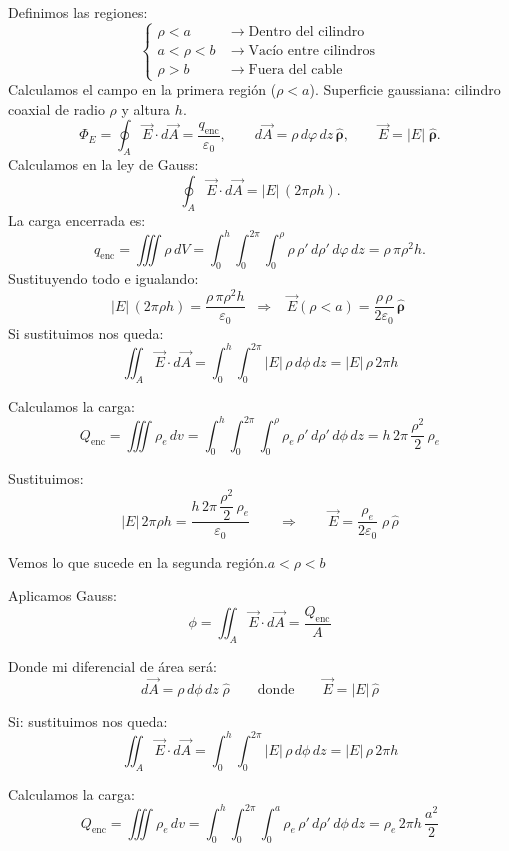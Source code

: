 \documentclass[a4paper,12pt]{article}
\begin{document}
\medskip
\noindent
Definimos las regiones:
\[
\left\{
\begin{aligned}
\rho < a      &\;\rightarrow\; \text{Dentro del cilindro} \\
a < \rho < b  &\;\rightarrow\; \text{Vacío entre cilindros} \\
\rho > b      &\;\rightarrow\; \text{Fuera del cable}
\end{aligned}
\right.
\]
Calculamos el campo en la primera región (\(\rho<a\)).  
Superficie gaussiana: cilindro coaxial de radio \(\rho\) y altura \(h\).
\[
\Phi_E=\oint_{A}\vec E\cdot d\vec A=\frac{q_{\text{enc}}}{\varepsilon_0},\qquad
d\vec A=\rho\,d\varphi\,dz\,\hat{\boldsymbol \rho},\qquad
\vec E=|\!E|\;\hat{\boldsymbol \rho}.
\]
Calculamos en la ley de Gauss:
\[
\oint_{A}\vec E\cdot d\vec A = |\!E|\,(2\pi \rho h).
\]
La carga encerrada es:
\[
q_{\text{enc}}=\iiint \rho\, dV
=\int_{0}^{h}\!\!\int_{0}^{2\pi}\!\!\int_{0}^{\rho}\rho\,\rho'\,d\rho'\,d\varphi\,dz
=\rho\,\pi \rho^{2} h.
\]
Sustituyendo todo e igualando:
\[
|\!E|\,(2\pi \rho h)=\frac{\rho\,\pi \rho^{2} h}{\varepsilon_0}
\;\;\Longrightarrow\;\;
\boxed{\;\vec E(\rho<a)=\dfrac{\rho\,\rho}{2\varepsilon_0}\,\hat{\boldsymbol \rho}\;}
\]
\newpage
\noindent
Si sustituimos nos queda:
\[
\iint_{A} \vec{E}\cdot d\vec{A}
=\int_{0}^{h}\!\!\int_{0}^{2\pi} |E|\,\rho\, d\phi\, dz
=|E|\,\rho\,2\pi h
\]

\noindent
Calculamos la carga:
\[
Q_{\text{enc}}
=\iiint \rho_{e}\,dv
=\int_{0}^{h}\!\!\int_{0}^{2\pi}\!\!\int_{0}^{\rho}
\rho_{e}\,\rho'\, d\rho'\, d\phi\, dz
=h\,2\pi\,\frac{\rho^{2}}{2}\,\rho_{e}
\]

\noindent
Sustituimos:
\[
|E|\,2\pi\rho h
=\frac{h\,2\pi\,\dfrac{\rho^{2}}{2}\,\rho_{e}}{\varepsilon_{0}}
\qquad\Longrightarrow\qquad
\vec{E}=\frac{\rho_{e}}{2\varepsilon_{0}}\;\rho\,\hat{\rho}
\]

\bigskip
\noindent
Vemos lo que sucede en la segunda región.\quad $a<\rho<b$

\medskip
\noindent
Aplicamos Gauss:
\[
\phi=\iint_{A} \vec{E}\cdot d\vec{A}
=\frac{Q_{\text{enc}}}{A}
\]

\noindent
Donde mi diferencial de área será:
\[
d\vec{A}=\rho\, d\phi\, dz\;\hat{\rho}
\qquad\text{donde}\qquad
\vec{E}=|E|\,\hat{\rho}
\]

\noindent
Si: sustituimos nos queda:
\[
\iint_{A} \vec{E}\cdot d\vec{A}
=\int_{0}^{h}\!\!\int_{0}^{2\pi} |E|\,\rho\, d\phi\, dz
=|E|\,\rho\,2\pi h
\]

\noindent
Calculamos la carga:
\[
Q_{\text{enc}}
=\iiint \rho_{e}\,dv
=\int_{0}^{h}\!\!\int_{0}^{2\pi}\!\!\int_{0}^{a}
\rho_{e}\,\rho'\, d\rho'\, d\phi\, dz
=\rho_{e}\,2\pi h\,\frac{a^{2}}{2}
\]
\end{document}
